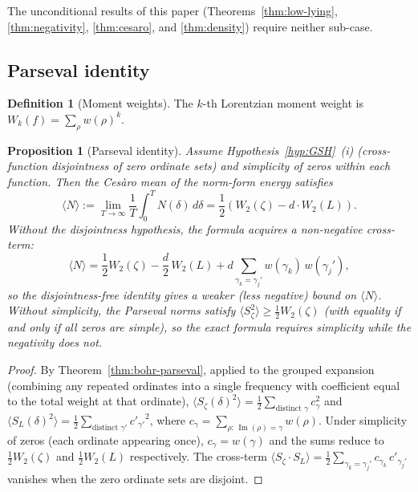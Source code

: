 \documentclass[12pt,reqno]{amsart}
\theoremstyle{plain}
\newtheorem{proposition}[theorem]{Proposition}
\theoremstyle{definition}
\newtheorem{definition}[theorem]{Definition}
\theoremstyle{remark}
\newcommand{\half}{\tfrac{1}{2}}
\begin{document}
The unconditional results of this paper (Theorems~\ref{thm:low-lying},
\ref{thm:negativity}, \ref{thm:cesaro}, and \ref{thm:density}) require
neither sub-case.

\subsection{Parseval identity}

\begin{definition}[Moment weights]\label{def:moments}
The $k$-th Lorentzian moment weight is $W_k(f) = \sum_\rho w(\rho)^k$.
\end{definition}

\begin{proposition}[Parseval identity]\label{prop:parseval}
Assume Hypothesis~\ref{hyp:GSH}~\textup{(i)} (cross-function disjointness of zero ordinate sets) and simplicity of zeros within each function.  Then the Ces\`aro mean of the norm-form energy satisfies
\[
  \langle N \rangle := \lim_{T \to \infty} \frac{1}{T} \int_0^T N(\delta) \, d\delta = \frac{1}{2}(W_2(\zeta) - d \cdot W_2(L)).
\]
Without the disjointness hypothesis, the formula acquires a non-negative cross-term:
\[
  \langle N \rangle = \frac{1}{2}W_2(\zeta) - \frac{d}{2}\,W_2(L) + d \sum_{\gamma_k = \gamma_j'} w(\gamma_k)\,w(\gamma_j'),
\]
so the disjointness-free identity gives a weaker (less negative) bound on $\langle N \rangle$.  Without simplicity, the Parseval norms satisfy $\langle S_\zeta^2 \rangle \geq \half W_2(\zeta)$ (with equality if and only if all zeros are simple), so the exact formula requires simplicity while the negativity does not.
\end{proposition}

\begin{proof}
By Theorem~\ref{thm:bohr-parseval}, applied to the grouped expansion (combining any repeated ordinates into a single frequency with coefficient equal to the total weight at that ordinate), $\langle S_\zeta(\delta)^2 \rangle = \half \sum_{\text{distinct }\gamma} c_\gamma^2$ and $\langle S_L(\delta)^2 \rangle = \half \sum_{\text{distinct }\gamma'} {c'_{\gamma'}}^2$, where $c_\gamma = \sum_{\rho:\,\operatorname{Im}(\rho) = \gamma} w(\rho)$.  Under simplicity of zeros (each ordinate appearing once), $c_\gamma = w(\gamma)$ and the sums reduce to $\half W_2(\zeta)$ and $\half W_2(L)$ respectively.  The cross-term $\langle S_\zeta \cdot S_L \rangle = \half \sum_{\gamma_k = \gamma_j'} c_{\gamma_k}\,c'_{\gamma_j'}$ vanishes when the zero ordinate sets are disjoint.
\end{proof}
\end{document}

